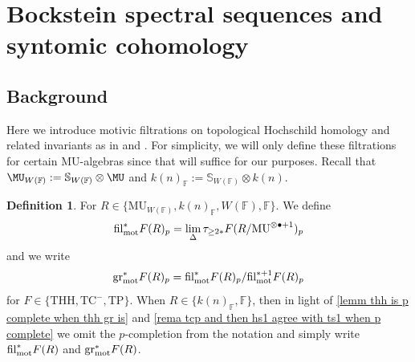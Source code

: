 \documentclass[english,10pt]{amsart}
\newcommand{\field}{\mathbb{F}}
\theoremstyle{definition}
\newtheorem{defi}{Definition}[section]
\numberwithin{equation}{section}
\begin{document}
\section{Bockstein spectral sequences and syntomic cohomology}\label{syntomic}

\subsection{Background}
Here we introduce motivic filtrations on topological Hochschild homology and related invariants as in \cite{hahn2022motivic} and \cite{angelini2024syntomic}. For simplicity, we will only define these filtrations for certain $\mathrm{MU}$-algebras since that will suffice for our purposes. Recall that $\MU_{W(\field)}:=\mathbb{S}_{W(\field)}\otimes \MU$ and $k(n)_{\field}:=\mathbb{S}_{W(\field)}\otimes k(n)$. 

\begin{defi}\label{defin-motivic}
For $R\in \{\mathrm{MU}_{W(\field)},k(n)_{\field},W(\field),\field\}$. We define 
\[ \mathrm{fil}_{\textup{mot}}^{*}F(R)_p=\lim_{\Delta}\tau_{\ge 2*}F(R/\mathrm{MU}^{\otimes \bullet+1})_p
\] 
and we write 
\[ 
\mathrm{gr}_{\textup{mot}}^{*}F(R)_p= \mathrm{fil}_{\textup{mot}}^{*}F(R)_p/ \mathrm{fil}_{\textup{mot}}^{*+1}F(R)_p
\]
for $F\in \{\mathrm{THH},\mathrm{TC}^{-}, \mathrm{TP}\}$. When $R\in \{k(n)_{\field},\field\}$, then in light of \autoref{lemm thh is p complete when thh gr is} and \autoref{rema tcp and then hs1 agree with ts1 when p complete} we omit the $p$-completion from the notation and simply write $\mathrm{fil}_{\textup{mot}}^{*}F(R)$ and $\mathrm{gr}_{\textup{mot}}^{*}F(R)$. 
\end{defi}
\end{document}
